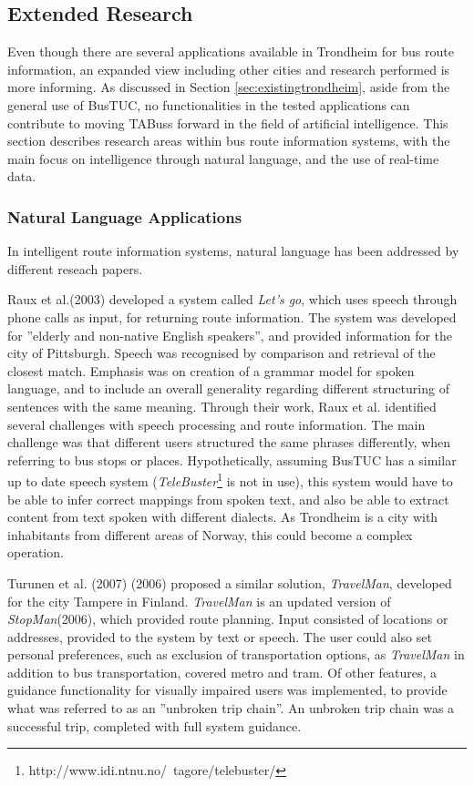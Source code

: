 \subsection{Extended Research}
Even though there are several applications available in Trondheim for bus route information, an expanded view including other cities and research performed is more informing. As discussed in Section \ref{sec:existingtrondheim}, aside from the general use of BusTUC, no functionalities in the tested applications can contribute to moving TABuss forward in the field of artificial intelligence. This section describes research areas within bus route information systems, with the main focus on intelligence through natural language, and the use of real-time data. 

\subsubsection{Natural Language Applications}
In intelligent route information systems, natural language has been addressed by different reseach papers\cite{Raux03let'sgo:}\cite{Turunen_mobilespeech-based}\cite {Turunen_designof}\cite{Turunen06evaluationof}. 

Raux et al.(2003) developed a system called \emph{Let's go}, which uses speech through phone calls as input, for returning route information\cite{Raux03let'sgo:}. The system was developed for ''elderly and non-native English speakers'', and provided information for the city of Pittsburgh. Speech was recognised by comparison and retrieval of the closest match. Emphasis was on creation of a grammar model for spoken language, and to include an overall generality regarding different structuring of sentences with the same meaning. Through their work, Raux et al. identified several challenges with speech processing and route information. The main challenge was that different users structured the same phrases differently, when referring to bus stops or places. Hypothetically, assuming BusTUC has a similar up to date speech system (\emph{TeleBuster}\footnote{http://www.idi.ntnu.no/~tagore/telebuster/} is not in use), this system would have to be able to infer correct mappings from spoken text, and also be able to extract content from text spoken with different dialects. As Trondheim is a city with inhabitants from different areas of Norway, this could become a complex operation. 

Turunen et al. (2007)\cite{Turunen_designof} (2006)\cite{Turunen06evaluationof} proposed a similar solution, \emph{TravelMan}, developed for the city Tampere in Finland. \emph{TravelMan} is an updated version of \emph{StopMan}\cite{Turunen_mobilespeech-based}(2006), which provided route planning. Input consisted of locations or addresses, provided to the system by text or speech. The user could also set personal preferences, such as exclusion of transportation options, as \emph{TravelMan} in addition to bus transportation, covered metro and tram. Of other features, a guidance functionality for visually impaired users was implemented, to provide what was referred to as an ''unbroken trip chain''. An unbroken trip chain was a successful trip, completed with full system guidance.


